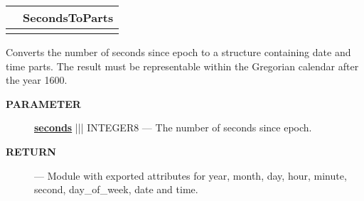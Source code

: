{\renewcommand{\arraystretch}{1.5}
\begin{tabularx}{\textwidth}{|>{\raggedright\arraybackslash}l|X|}
\hline
\hspace{0pt}\mytexttt{\color{red} } & \textbf{SecondsToParts} \\
\hline
\multicolumn{2}{|>{\raggedright\arraybackslash}X|}{\hspace{0pt}\mytexttt{\color{param} (Seconds\_t seconds)}} \\
\hline
\end{tabularx}
}

\par





Converts the number of seconds since epoch to a structure containing date and time parts. The result must be representable within the Gregorian calendar after the year 1600.






\par
\begin{description}
\item [\colorbox{tagtype}{\color{white} \textbf{\textsf{PARAMETER}}}] \textbf{\underline{seconds}} ||| INTEGER8 --- The number of seconds since epoch.
\end{description}







\par
\begin{description}
\item [\colorbox{tagtype}{\color{white} \textbf{\textsf{RETURN}}}] \textbf{} --- Module with exported attributes for year, month, day, hour, minute, second, day\_of\_week, date and time.
\end{description}




